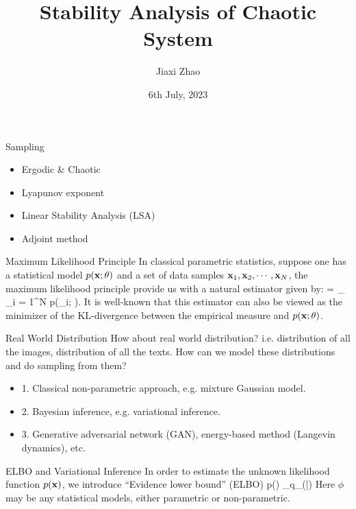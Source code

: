 \documentclass{beamer}
\title[Stability]{Stability Analysis of Chaotic System}
\author[J. Zhao]{Jiaxi Zhao}
\date{6th July, 2023}
\begin{document}
\par \setlength{\parindent}{2em}

\begin{frame}
\titlepage

\end{frame}


\begin{frame}{Sampling}
	\begin{itemize}
		\item Ergodic \& Chaotic
		\item Lyapunov exponent
		\item Linear Stability Analysis (LSA)
		\item Adjoint method
	\end{itemize}
\end{frame}


\begin{frame}{Maximum Likelihood Principle}
	In classical parametric statistics, suppose one has a statistical model $p(\mathbf{x}; \theta)$ and a set of data samples $\mathbf{x}_1, \mathbf{x}_2, \cdots, \mathbf{x}_N$, the maximum likelihood principle provide us with a natural estimator given by:
	\bequn
		\wht\theta = \arg\max_{\theta} \log \prod_{i = 1}^N p(\mfx_i; \theta).
	\eequn
	It is well-known that this estimator can also be viewed as the minimizer of the KL-divergence between the empirical measure and $p(\mathbf{x}; \theta)$.
\end{frame}


\begin{frame}{Real World Distribution}
	How about real world distribution? i.e. distribution of all the images, distribution of all the texts. How can we model these distributions and do sampling from them?
	\begin{itemize}
		\item 1. Classical non-parametric approach, e.g. mixture Gaussian model.
		\item 2. Bayesian inference, e.g. variational inference.
		\item 3. Generative adversarial network (GAN), energy-based method (Langevin dynamics), etc.
	\end{itemize}
\end{frame}


\begin{frame}{ELBO and Variational Inference}
	In order to estimate the unknown likelihood function $p(\mathbf{x})$, we introduce ``Evidence lower bound'' (ELBO)
	\bequn
		\log p(\mfx) \geq \mbE_{q_{\phi}(\mfz|\mfx)}\lb \log {} \rb
	\eequn
	Here $\phi$ may be any statistical models, either parametric or non-parametric. 
\end{frame}
\end{document}
